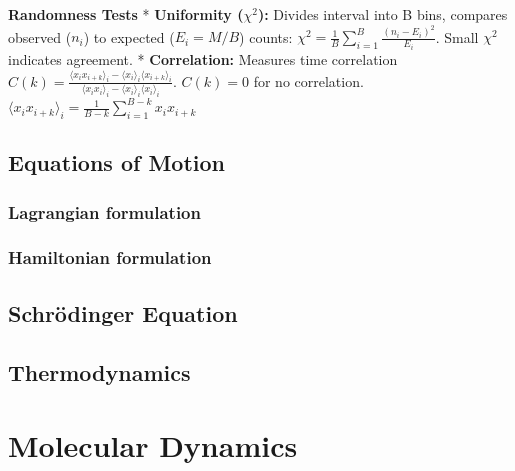\documentclass{article}
\begin{document}
 

   





 

\textbf{Randomness Tests} * \textbf{Uniformity (\(\chi^{2}\)):} Divides interval into B bins, compares observed (\(n_{i}\)) to expected (\(E_{i} = M/B\)) counts: \(\chi^{2} = \frac{1}{B}\sum_{i = 1}^{B}\frac{\left( n_{i} - E_{i} \right)^{2}}{E_{i}}\). Small \(\chi^{2}\) indicates agreement. * \textbf{Correlation:} Measures time correlation \(C(k) = \frac{\langle x_{i}x_{i + k}\rangle_{i} - \langle x_{i}\rangle_{i}\langle x_{i + k}\rangle_{i}}{\langle x_{i}x_{i}\rangle_{i} - \langle x_{i}\rangle_{i}\langle x_{i}\rangle_{i}}\). \(C(k) = 0\) for no correlation. \(\langle x_{i}x_{i + k}\rangle_{i} = \frac{1}{B - k}\sum_{i = 1}^{B - k}x_{i}x_{i + k}\)

\subsection{Equations of Motion}\label{equations-of-motion}    \subsubsection{Lagrangian formulation}\label{lagrangian-formulation}  

\subsubsection{Hamiltonian formulation}\label{hamiltonian-formulation}  

\subsection{Schrödinger Equation}\label{schrödinger-equation}  

\subsection{Thermodynamics}\label{thermodynamics}    





 

 

 

 

\section{Molecular Dynamics}\label{molecular-dynamics}   
\end{document}
